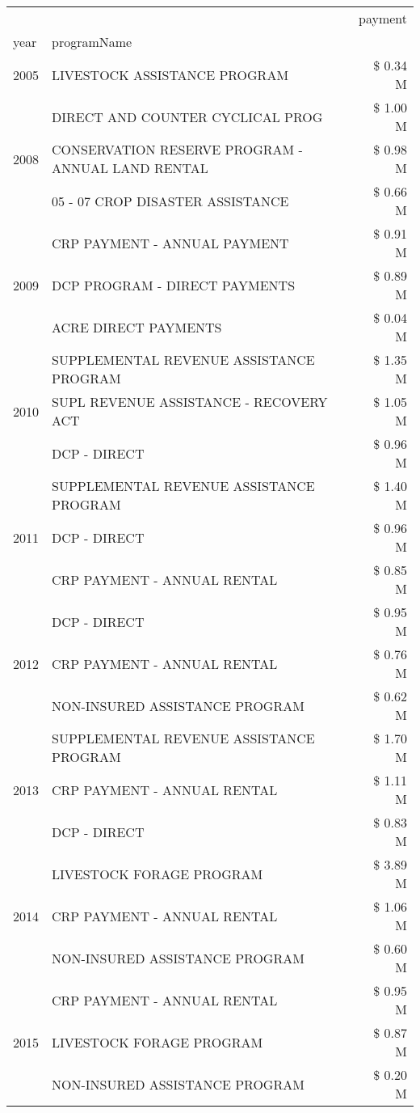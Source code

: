 \begin{tabular}{llr}
\toprule
 &  & payment \\
year & programName &  \\
\midrule
2005 & LIVESTOCK ASSISTANCE PROGRAM & \$ 0.34 M \\
\cline{1-3}
\multirow[t]{3}{*}{2008} & DIRECT AND COUNTER CYCLICAL PROG & \$ 1.00 M \\
 & CONSERVATION RESERVE PROGRAM - ANNUAL LAND RENTAL & \$ 0.98 M \\
 & 05 - 07 CROP DISASTER ASSISTANCE & \$ 0.66 M \\
\cline{1-3}
\multirow[t]{3}{*}{2009} & CRP PAYMENT - ANNUAL PAYMENT & \$ 0.91 M \\
 & DCP PROGRAM - DIRECT PAYMENTS & \$ 0.89 M \\
 & ACRE DIRECT PAYMENTS & \$ 0.04 M \\
\cline{1-3}
\multirow[t]{3}{*}{2010} & SUPPLEMENTAL REVENUE ASSISTANCE PROGRAM & \$ 1.35 M \\
 & SUPL REVENUE ASSISTANCE - RECOVERY ACT & \$ 1.05 M \\
 & DCP - DIRECT & \$ 0.96 M \\
\cline{1-3}
\multirow[t]{3}{*}{2011} & SUPPLEMENTAL REVENUE ASSISTANCE PROGRAM & \$ 1.40 M \\
 & DCP - DIRECT & \$ 0.96 M \\
 & CRP PAYMENT - ANNUAL RENTAL & \$ 0.85 M \\
\cline{1-3}
\multirow[t]{3}{*}{2012} & DCP - DIRECT & \$ 0.95 M \\
 & CRP PAYMENT - ANNUAL RENTAL & \$ 0.76 M \\
 & NON-INSURED ASSISTANCE PROGRAM & \$ 0.62 M \\
\cline{1-3}
\multirow[t]{3}{*}{2013} & SUPPLEMENTAL REVENUE ASSISTANCE PROGRAM & \$ 1.70 M \\
 & CRP PAYMENT - ANNUAL RENTAL & \$ 1.11 M \\
 & DCP - DIRECT & \$ 0.83 M \\
\cline{1-3}
\multirow[t]{3}{*}{2014} & LIVESTOCK FORAGE PROGRAM & \$ 3.89 M \\
 & CRP PAYMENT - ANNUAL RENTAL & \$ 1.06 M \\
 & NON-INSURED ASSISTANCE PROGRAM & \$ 0.60 M \\
\cline{1-3}
\multirow[t]{3}{*}{2015} & CRP PAYMENT - ANNUAL RENTAL & \$ 0.95 M \\
 & LIVESTOCK FORAGE PROGRAM & \$ 0.87 M \\
 & NON-INSURED ASSISTANCE PROGRAM & \$ 0.20 M \\

\end{tabular}
